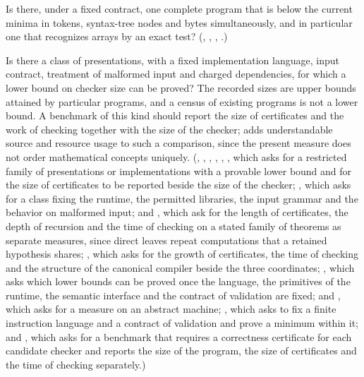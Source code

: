 \begin{question}
Is there, under a fixed contract, one complete program that is below the
current minima in tokens, syntax-tree nodes and bytes simultaneously, and in
particular one that recognizes arrays by an exact test?
(, ,
, .)
\end{question}

\begin{question}
Is there a class of presentations, with a fixed implementation language,
input contract, treatment of malformed input and charged dependencies, for
which a lower bound on checker size can be proved? The recorded sizes are
upper bounds attained by particular programs, and a census of existing
programs is not a lower bound. A benchmark of this kind should report the
size of certificates and the work of checking together with the size of the
checker;  adds understandable source and resource usage to
such a comparison, since the present measure does not order mathematical
concepts uniquely. (, ,
, , ,
, which asks for a restricted family of presentations or
implementations with a provable lower bound and for the size of certificates to be
reported beside the size of the checker; , which asks for a
class fixing the runtime, the permitted libraries, the input grammar and the behavior
on malformed input;  and , which ask for the
length of certificates, the depth of recursion and the time of checking on a stated
family of theorems as separate measures, since direct leaves repeat computations that
a retained hypothesis shares; , which asks for the growth of certificates, the
time of checking and the structure of the canonical compiler beside the three coordinates;
, which asks which lower bounds can be proved once the language, the
primitives of the runtime, the semantic interface and the contract of validation are fixed; and
, which asks for a measure on an abstract machine; ,
which asks to fix a finite instruction language and a contract of validation and prove a minimum within
it; and , which asks for a benchmark that requires a correctness certificate for
each candidate checker and reports the size of the program, the size of certificates and the time of
checking separately.)
\end{question}

